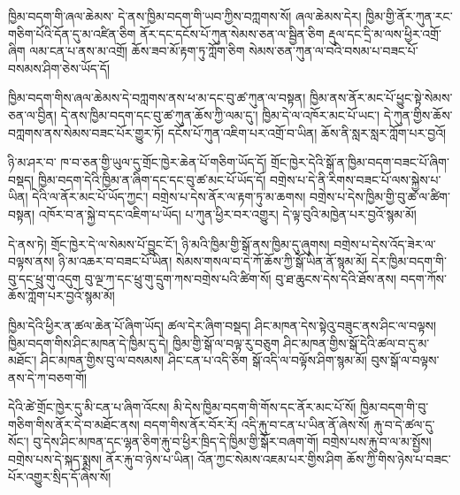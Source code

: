 \documentclass[12pt]{nextbook}
\begin{document}
\begin{readersection}{ཁྱིམ་བདག་གི་ཞལ་ཆེམས་}
དེ་ནས་ཁྱིམ་བདག་གི་ཡབ་ཀྱིས་བཀླགས་སོ། ཞལ་ཆེམས་དེར། ཁྱིམ་གྱི་ནོར་ཀུན་རང་གཅིག་པོའི་དོན་དུ་མ་འཛིན་ཅིག ནོར་དང་དངོས་པོ་ཀུན་སེམས་ཅན་ལ་སྦྱིན་ཅིག རྡུལ་དང་དྲི་མ་ལས་ཕྱིར་འགྲོ་ཞིག ལམ་ངན་པ་ནས་མ་འགྲོ། ཆོས་ཟབ་མོ་རྟག་ཏུ་ཀློག་ཅིག སེམས་ཅན་ཀུན་ལ་བའི་བསམ་པ་བཟང་པོ་བསམས་ཤིག་ཅེས་ཡོད་དོ།

ཁྱིམ་བདག་གིས་ཞལ་ཆེམས་དེ་བཀླགས་ནས་ཕ་མ་དང་བུ་ཚ་ཀུན་ལ་བསྟན། ཁྱིམ་ནས་ནོར་མང་པོ་ཕྱུང་སྟེ་སེམས་ཅན་ལ་བྱིན། དེ་ནས་ཁྱིམ་བདག་དང་བུ་ཚ་ཀུན་ཆོས་ཀྱི་ལམ་དུ་། ཁྱིམ་དེ་ལ་འཁོར་མང་པོ་ཡང་། དེ་ཀུན་གྱིས་ཆོས་བཀླགས་ནས་སེམས་བཟང་པོར་གྱུར་ཏོ། དངོས་པོ་ཀུན་འཇིག་པར་འགྲོ་བ་ཡིན། ཆོས་ནི་སླར་སླར་ཀློག་པར་བྱའོ།
\end{readersection}

\begin{readersection}{ཉི་མ་ཤར་བ་}
ཁ་བ་ཅན་གྱི་ཡུལ་དུ་གྲོང་ཁྱེར་ཆེན་པོ་གཅིག་ཡོད་དོ། གྲོང་ཁྱེར་དེའི་སྒོ་ན་ཁྱིམ་བདག་བཟང་པོ་ཞིག་བསྡད། ཁྱིམ་བདག་དེའི་ཁྱིམ་ན་ཞིག་དང་དང་བུ་ཚ་མང་པོ་ཡོད་དོ། བགྲེས་པ་དེ་ནི་རིགས་བཟང་པོ་ལས་སྐྱེས་པ་ཡིན། དེའི་ལ་ནོར་མང་པོ་ཡོད་ཀྱང་། བགྲེས་པ་དེས་ནོར་ལ་རྟག་ཏུ་མ་ཆགས། བགྲེས་པ་དེས་ཁྱིམ་གྱི་བུ་ཚ་ལ་ཚིག་བསྟན། འཁོར་བ་ན་སྐྱེ་བ་དང་འཇིག་པ་ཡོད། པ་ཀུན་ཕྱིར་བར་འགྱུར། དེ་ལྟ་བུའི་མཁྱེན་པར་བྱའོ་སྙམ་མོ།

དེ་ནས་ཏེ། གྲོང་ཁྱེར་དེ་ལ་སེམས་པོ་བྱུང་ངོ་། ཉི་མའི་ཁྱིམ་གྱི་སྒོ་ནས་ཁྱིམ་དུ་ཞུགས། བགྲེས་པ་དེས་འོད་ཟེར་ལ་བལྟས་ནས། ཉི་མ་འཆར་བ་བཟང་པོ་ཡིན། སེམས་གསལ་བ་དེ་ཀོ་ཆོས་ཀྱི་སྒོ་ཡིན་ནོ་སྙམ་མོ། དེར་ཁྱིམ་བདག་གི་བུ་དང་ཕྲུ་གུ་འདུག བུ་ལྔ་ཀ་དང་ཕྲུ་གུ་དྲུག་ཀས་བགྲེས་པའི་ཚིག་སོ། བུ་ཐ་ཆུངས་དེས་དེའི་ཐོས་ནས། བདག་ཀོས་ཆོས་ཀློག་པར་བྱའོ་སྙམ་མོ།

ཁྱིམ་དེའི་ཕྱིར་ན་ཚལ་ཆེན་པོ་ཞིག་ཡོད། ཚལ་དེར་ཞིག་བསྡད། ཤིང་མཁན་དེས་སྟེའུ་བཟུང་ནས་ཤིང་ལ་བལྟས། ཁྱིམ་བདག་གིས་ཤིང་མཁན་དེ་ཁྱིམ་དུ་དེ། ཁྱིམ་གྱི་སྒོ་ལ་བལྟ་རུ་བཅུག ཤིང་མཁན་གྱིས་སྒོ་དེའི་ཚལ་བ་དུ་མ་མཐོང་། ཤིང་མཁན་གྱིས་བུ་ལ་བསམས། ཤིང་ངན་པ་འདི་ཅིག སྒོ་འདི་ལ་བལྟོས་ཤིག་སྙམ་མོ། བུས་སྒོ་ལ་བལྟས་ནས་དེ་ཀ་བཅག་གོ།

དེའི་ཚེ་གྲོང་ཁྱེར་དུ་མི་ངན་པ་ཞིག་འོངས། མི་དེས་ཁྱིམ་བདག་གི་གོས་དང་ནོར་མང་པོ་སོ། ཁྱིམ་བདག་གི་བུ་གཅིག་གིས་ནོར་དེ་བ་མཐོང་ནས། བདག་གིས་ནོར་བོར་རོ། འདི་རྐུ་བ་ངན་པ་ཡིན་ནོ་ཞེས་སོ། རྐུ་བ་དེ་ཚལ་དུ་སོང་། བུ་དེས་ཤིང་མཁན་དང་ལྷན་ཅིག་རྐུ་བ་ཕྱིར་ཁྲིད་དེ་ཁྱིམ་གྱི་སྒོར་བཞག་གོ། བགྲེས་པས་རྐུ་བ་ལ་མ་སྤྱོས། བགྲེས་པས་དེ་སྐད་སྨྲས། ནོར་རྐུ་བ་ཉེས་པ་ཡིན། འོན་ཀྱང་སེམས་འཇམ་པར་གྱིས་ཤིག ཆོས་ཀྱི་གིས་ཉེས་པ་བཟང་པོར་འགྱུར་སྲིད་དོ་ཞེས་སོ།


\end{readersection}
\end{document}
